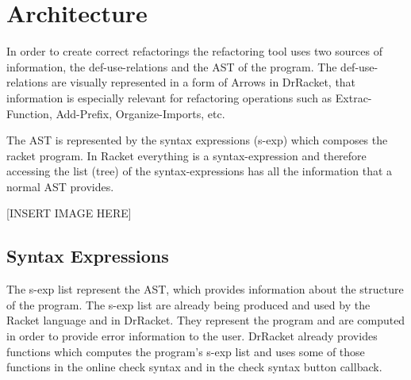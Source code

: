 
\section{Architecture}


In order to create correct refactorings the refactoring tool uses  two sources of
information, the def-use-relations and the AST of the program.
The def-use-relations are visually represented in a form of Arrows in DrRacket,
that information is especially relevant for refactoring operations such as Extrac-Function,
Add-Prefix, Organize-Imports, etc.

The AST is represented by the syntax expressions (s-exp) which composes the racket program.
In Racket everything is a syntax-expression and therefore accessing the list (tree)
of the syntax-expressions has all the information that a normal AST provides. %


[INSERT IMAGE HERE]


\subsection{Syntax Expressions}
The s-exp list represent the AST, which provides information about
the structure of the program.
The s-exp list are already being produced and used by the Racket language and
in DrRacket.
They represent the program and are computed in order to provide error information
to the user.
DrRacket already provides functions which computes the program's s-exp list and uses some of those
functions in the online check syntax and in the check syntax button callback.


